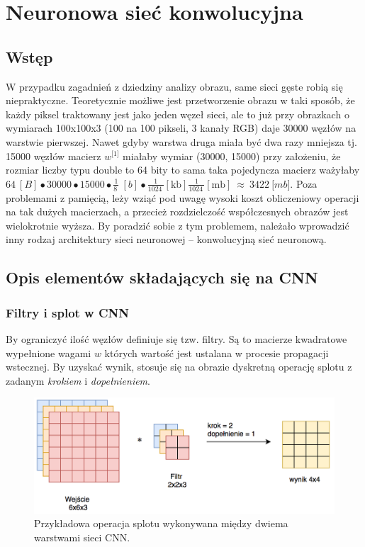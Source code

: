 \chapter{Neuronowa sieć konwolucyjna}
\label{chap:cnn}
\section{Wstęp}
\label{cnn-wstęp}
W przypadku zagadnień z dziedziny analizy obrazu, same sieci gęste robią się niepraktyczne. Teoretycznie możliwe jest przetworzenie obrazu w taki sposób, że każdy piksel traktowany jest jako jeden węzeł sieci, ale to już przy obrazkach o wymiarach 100x100x3 (100 na 100 pikseli, 3 kanały RGB) daje 30000 węzłów na warstwie pierwszej. Nawet gdyby warstwa druga
miała być dwa razy mniejsza tj. 15000 węzłów macierz \(w^{\lbrack 1\rbrack}\) miałaby wymiar (30000, 15000) przy założeniu, że rozmiar liczby typu double to 64 bity to sama taka pojedyncza macierz ważyłaby \(64\ \left\lbrack B \right\rbrack \bullet 30000 \bullet 15000 \bullet \frac{1}{8\ }\ \left\lbrack b \right\rbrack \bullet \frac{1}{1024\ }\left\lbrack \text{kb} \right\rbrack\frac{1}{1024\ }\left\lbrack \text{mb} \right\rbrack\  \approx \ 3422\ \lbrack mb\rbrack\). Poza problemami z pamięcią,
leży wziąć pod uwagę wysoki koszt obliczeniowy operacji na tak dużych macierzach, a przecież rozdzielczość współczesnych obrazów jest wielokrotnie wyższa. By poradzić sobie z tym problemem, należało wprowadzić inny rodzaj architektury sieci neuronowej -- konwolucyjną sieć neuronową.

\section{Opis elementów składających się na CNN}
\label{opis-elementów-cnn}

\subsection{Filtry i splot w CNN}

By ograniczyć ilość węzłów definiuje się tzw. filtry. Są to macierze kwadratowe wypełnione wagami \(w\) których wartość jest ustalana w procesie propagacji wstecznej. By uzyskać wynik, stosuje się na obrazie dyskretną operację splotu z zadanym \emph{krokiem} i \emph{dopełnieniem}.

\begin{figure}[ht]
\centerline{\includegraphics[scale=0.8]{resources/splot.png}}
\caption{Przykładowa operacja splotu wykonywana między dwiema warstwami sieci CNN.}
\label{fig:splot}
\end{figure}

